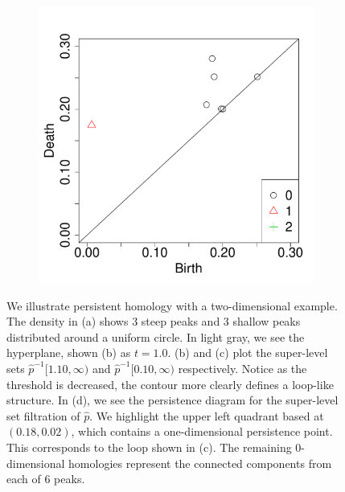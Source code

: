 \documentclass[12pt]{article}
\begin{document}
\begin{figure}
\begin{subfigure}{.25\linewidth}
    \label{fig:example_contour2}
  \end{subfigure}
    \begin{subfigure}{.20\linewidth}
    \centering
    \caption{}  
        \includegraphics[width=\linewidth]{tmp5.pdf}
    \label{fig:example_pd}
  \end{subfigure}
  \caption{ We illustrate persistent homology with a two-dimensional example. The density in (a) shows 3 steep peaks and 3 shallow peaks  distributed around a uniform circle. In light gray, we see the hyperplane, shown (b) as $t=1.0$. (b) and (c) plot the super-level sets $\widehat{p}^{-1}[1.10,\infty)$ and $\widehat{p}^{-1}[0.10,\infty)$ respectively. Notice as the threshold is decreased, the contour more clearly defines a loop-like structure. In (d), we see the  persistence diagram for the super-level set filtration of $\widehat{p}$. We highlight the upper left quadrant based at $(0.18, 0.02)$, which contains a one-dimensional persistence point. This corresponds to the loop shown in (c). The remaining 0-dimensional homologies represent the connected components from each of 6 peaks.} %
    \label{fig:homologyexample}
\end{figure}
\end{document}
